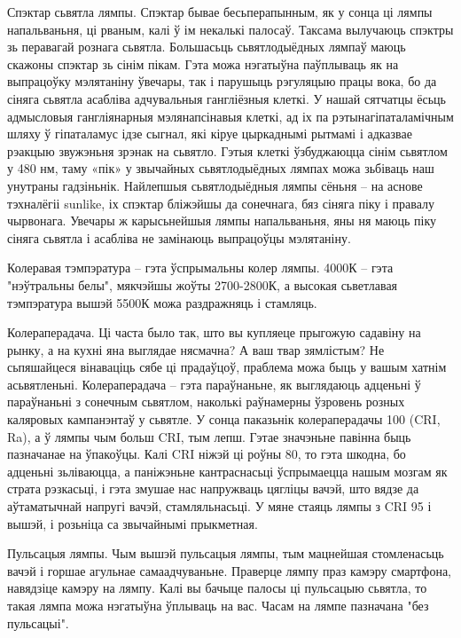 Спэктар сьвятла лямпы. Спэктар бывае бесьперапынным, як у сонца ці лямпы напальваньня, ці рваным, калі ў ім некалькі палосаў. Таксама вылучаюць спэктры зь перавагай рознага сьвятла. Большасьць сьвятлодыёдных лямпаў маюць скажоны спэктар зь сінім пікам. Гэта можа нэгатыўна паўплываць як на выпрацоўку мэлятаніну ўвечары, так і парушыць рэгуляцыю працы вока, бо да сіняга сьвятла асабліва адчувальныя гангліёзныя клеткі. У нашай сятчатцы ёсьць адмысловыя гангліянарныя мэлянапсінавыя клеткі, ад іх па рэтынагіпаталамічным шляху ў гіпаталамус ідзе сыгнал, які кіруе цыркаднымі рытмамі і адказвае рэакцыю звужэньня зрэнак на сьвятло. Гэтыя клеткі ўзбуджаюцца сінім сьвятлом у 480 нм, таму «пік» у звычайных сьвятлодыёдных лямпах можа зьбіваць наш унутраны гадзіньнік. Найлепшыя сьвятлодыёдныя лямпы сёньня – на аснове тэхналёгіі sunlike, іх спэктар бліжэйшы да сонечнага, бяз сіняга піку і правалу чырвонага. Увечары ж карысьнейшыя лямпы напальваньня, яны ня маюць піку сіняга сьвятла і асабліва не замінаюць выпрацоўцы мэлятаніну.

Колеравая тэмпэратура – гэта ўспрымальны колер лямпы. 4000К – гэта "нэўтральны белы", мякчэйшы жоўты 2700-2800К, а высокая сьветлавая тэмпэратура вышэй 5500К можа раздражняць і стамляць.

Колераперадача. Ці часта было так, што вы купляеце прыгожую садавіну на рынку, а на кухні яна выглядае нясмачна? А ваш твар зямлістым? Не сьпяшайцеся вінаваціць сябе ці прадаўцоў, праблема можа быць у вашым хатнім асьвятленьні. Колераперадача – гэта параўнаньне, як выглядаюць адценьні ў параўнаньні з сонечным сьвятлом, наколькі раўнамерны ўзровень розных каляровых кампанэнтаў у сьвятле. У сонца паказьнік колераперадачы 100 (CRI, Ra), а ў лямпы чым больш CRI, тым лепш. Гэтае значэньне павінна быць пазначанае на ўпакоўцы. Калі CRI ніжэй ці роўны 80, то гэта шкодна, бо адценьні зьліваюцца, а паніжэньне кантраснасьці ўспрымаецца нашым мозгам як страта рэзкасьці, і гэта змушае нас напружваць цягліцы вачэй, што вядзе да аўтаматычнай напругі вачэй, стамляльнасьці. У мяне стаяць лямпы з CRI 95 і вышэй, і розьніца са звычайнымі прыкметная.

Пульсацыя лямпы. Чым вышэй пульсацыя лямпы, тым мацнейшая стомленасьць вачэй і горшае агульнае самаадчуваньне. Праверце лямпу праз камэру смартфона, навядзіце камэру на лямпу. Калі вы бачыце палосы ці пульсацыю сьвятла, то такая лямпа можа нэгатыўна ўплываць на вас. Часам на лямпе пазначана "без пульсацыі".

